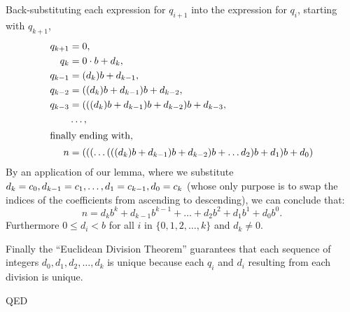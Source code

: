 \documentclass{article}
\begin{document}
\break
Back-substituting each expression for \(q_{i+1}\) into the expression for \(q_i\),
starting with \(q_{k+1}\),
\begin{alignat*}{1}
q_{k+1} &= 0,\\
q_k &= 0\cdot{}b + d_k,\\
q_{k-1} &= (d_k)b + d_{k-1},\\
q_{k-2} &= ((d_k)b + d_{k-1})b + d_{k-2},\\
q_{k-3} &= (((d_k)b + d_{k-1})b + d_{k-2})b + d_{k-3},\\
 &\dots{},\\
\intertext{finally ending with,}
n &= (((\dots{}(((d_k)b + d_{k-1})b + d_{k-2})b + \dots{} d_{2})b + d_{1})b + d_0)
\end{alignat*}
By an application of our lemma, where we substitute
\(d_k = c_0,
d_{k-1} = c_1, \dots{},\newline d_1 = c_{k-1}, d_0 = c_k\) (whose only purpose is to
swap the indices of the coefficients from ascending to descending), we can conclude that:
\[n = d_kb^k+d_{k-1}b^{k-1}+\dots+d_2b^2+d_1b^1+d_0b^0.\]
Furthermore \(0\le{}d_i<b\) for all \(i\) in \(\{0,1,2,\dots{},k\}\) and \(d_k\ne0\).

Finally the ``Euclidean Division Theorem'' guarantees that each sequence
of integers \(d_0, d_1, d_2, \dots{}, d_k\) is unique
because each \(q_i\) and \(d_i\) resulting from each division is unique.

\hspace*{\fill}QED
\end{document}
